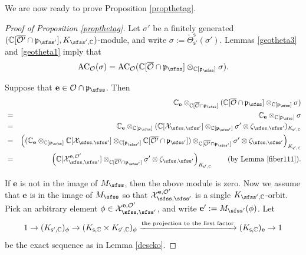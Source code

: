 \documentclass[11pt,a4paper]{amsart}
\newcommand{\CO}{{\mathcal {O}}}
\newcommand{\CX}{{\mathcal {X}}}
\newcommand{\p}{\mathfrak p}
\numberwithin{equation}{section}
\theoremstyle{remark}
\begin{document}
We are now ready to prove Proposition \ref{propthetag}.

\begin{proof}[Proof of Proposition \ref{propthetag}]
Let  $\sigma'$ be a finitely generated  $(\C[\overline{\CO'}\cap \p_{\sfss'}], K_{\sfss', \C})$-module, and write  $\sigma:=\check \Theta_{\mathsf s'}^{\mathsf s}(\sigma')$.
 Lemmas \ref{geotheta3} and \ref{geotheta1} imply that
\[
  \mathrm{AC}_{\CO}(\sigma)=\mathrm{AC}_{\CO}(\C[\overline \CO\cap \p_{\sfss}]\otimes_{\C[\p_{\sfss}]} \sigma).
\]

Suppose that $\mathbf e\in \CO\cap \p_\sfss$. Then
\begin{eqnarray*}
  && \C_\mathbf e \otimes_{\C[\overline \CO\cap \p_{\sfss}]} (\C[\overline \CO\cap \p_{\sfss}]\otimes_{\C[\p_{\sfss}]} \sigma)\\
  &=&  \C_\mathbf e \otimes_{\C[\p_{\sfss}]} \sigma\\
  &=&  \C_\mathbf e \otimes_{\C[\p_{\sfss}]} (\C[\CX_{\sfss, \sfss'}]\otimes_{\C[\p_{\sfss'}]} \sigma'\otimes \zeta_{\sfss, \sfss'})_{K_{\mathsf s', \C}} \\
   &=&\left( (\C_\mathbf e \otimes_{\C[\p_{\sfss}]} \C[\CX_{\sfss, \sfss'}]\otimes_{\C[\p_{\sfss'}]} \C[\overline{\CO'}\cap \p_{\sfss'}]) \otimes_{\C[\overline{\CO'}\cap \p_{\sfss'}]}\sigma'\otimes \zeta_{\sfss, \sfss'}\right)_{K_{\mathsf s', \C}} \\
      &=&\left( \C[\CX_{\sfss, \sfss'}^{\mathbf e, \CO'}] \otimes_{\C[\overline{\CO'}\cap \p_{\sfss'}]}\sigma'\otimes \zeta_{\sfss, \sfss'}\right)_{K_{\mathsf s', \C}} \qquad (\textrm{by Lemma \ref{fiber111}}).
\end{eqnarray*}

If $\mathbf e$ is not in the image of $M_\sfss$, then the above module is zero. Now we assume that $\mathbf e$ is in the image of $M_\sfss$ so that $\CX_{\sfss, \sfss'}^{\mathbf e, \CO'}$ is a single $K_{\sfss',\C}$-orbit. Pick an arbitrary element $\phi\in \CX_{\sfss, \sfss'}^{\mathbf e, \CO'}$, and write $\mathbf e':=M_{\sfss'}(\phi)$. Let
\[
  1\rightarrow  (K_{\mathsf s',\mathbb{C}})_\phi \rightarrow (K_{\mathsf s,\mathbb{C}}\times K_{\mathsf s', \mathbb{C}})_\phi\xrightarrow{\textrm{the projection to the first factor}} (K_{\mathsf s,\mathbb{C}})_{\mathbf e}\rightarrow 1
\]
be the exact  sequence as in Lemma \ref{descko}.



\end{proof}
\end{document}

